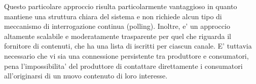 Questo particolare approccio risulta particolarmente vantaggioso in quanto mantiene una struttura chiara del sistema e non richiede alcun tipo di meccanismo di interrogazione continua (polling). Inoltre, e' un approccio altamente scalabile e moderatamente trasparente per quel che riguarda il fornitore di contenuti, che ha una lista di iscritti per ciascun canale. E' tuttavia necessario che vi sia una connessione persistente tra produttore e consumatori, pena l'impossibilita' del produttore di contattare direttamente i consumatori all'originarsi di un nuovo contenuto di loro interesse.
